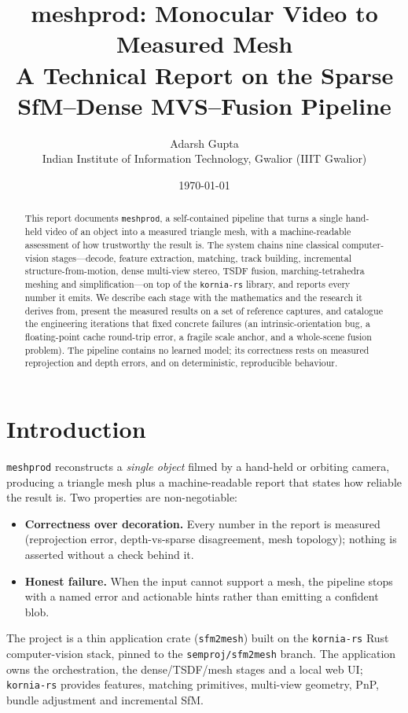 \documentclass[11pt,a4paper]{article}
\title{\bfseries meshprod: Monocular Video to Measured Mesh\\[0.3em]
\large A Technical Report on the Sparse SfM--Dense MVS--Fusion Pipeline}
\author{Adarsh Gupta\\Indian Institute of Information Technology, Gwalior (IIIT Gwalior)}
\date{\today}
\newcommand{\code}[1]{\texttt{#1}}
\begin{document}
\maketitle

\begin{abstract}
\noindent
This report documents \code{meshprod}, a self-contained pipeline that turns a single
hand-held video of an object into a measured triangle mesh, with a machine-readable
assessment of how trustworthy the result is. The system chains nine classical
computer-vision stages---decode, feature extraction, matching, track building, incremental
structure-from-motion, dense multi-view stereo, TSDF fusion, marching-tetrahedra meshing and
simplification---on top of the \code{kornia-rs} library, and reports every number it emits.
We describe each stage with the mathematics and the research it derives from, present the
measured results on a set of reference captures, and catalogue the engineering iterations
that fixed concrete failures (an intrinsic-orientation bug, a floating-point cache
round-trip error, a fragile scale anchor, and a whole-scene fusion problem). The pipeline
contains no learned model; its correctness rests on measured reprojection and depth errors,
and on deterministic, reproducible behaviour.
\end{abstract}

\tableofcontents

\section{Introduction}
\label{sec:intro}

\code{meshprod} reconstructs a \emph{single object} filmed by a hand-held or orbiting camera,
producing a triangle mesh plus a machine-readable report that states how reliable the result
is. Two properties are non-negotiable:

\begin{itemize}[leftmargin=1.5em]
\item \textbf{Correctness over decoration.} Every number in the report is measured
(reprojection error, depth-vs-sparse disagreement, mesh topology); nothing is asserted
without a check behind it.
\item \textbf{Honest failure.} When the input cannot support a mesh, the pipeline stops with a
named error and actionable hints rather than emitting a confident blob.
\end{itemize}

The project is a thin application crate (\code{sfm2mesh}) built on the \code{kornia-rs}
Rust computer-vision stack, pinned to the \code{semproj/sfm2mesh} branch. The application owns
the orchestration, the dense/TSDF/mesh stages and a local web UI; \code{kornia-rs} provides
features, matching primitives, multi-view geometry, PnP, bundle adjustment and incremental SfM.
\end{document}
